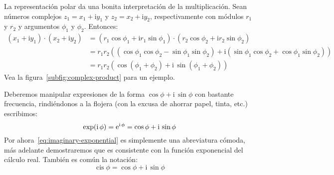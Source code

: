  La representación polar
  da una bonita interpretación de la multiplicación.
  Sean números complejos \(z_1 = x_1 + \mathrm{i} y_1\)
  y \(z_2 = x_2 + \mathrm{i} y_2\),
  respectivamente con módulos \(r_1\) y \(r_2\)
  y argumentos \(\phi_1\) y \(\phi_2\).
  Entonces:
  \begin{align*}
    (x_1 + \mathrm{i} y_1) \cdot (x_2 + \mathrm{i} y_2)
      &= (r_1 \cos \phi_1 + \mathrm{i} r_1 \sin \phi_1)
	   \cdot (r_2 \cos \phi_2 + \mathrm{i} r_2 \sin \phi_2) \\
      &= r_1 r_2
	   \left(
	     (\cos \phi_1 \cos \phi_2 - \sin \phi_1 \sin \phi_2)
	       + \mathrm{i}
		   (\sin \phi_1 \cos \phi_2 + \cos \phi_1 \sin \phi_2)
	   \right) \\
      &= r_1 r_2 (\cos (\phi_1 + \phi_2)
		    + \mathrm{i} \, \sin(\phi_1 + \phi_2))
  \end{align*}
  Vea la figura~\ref{subfig:complex-product} para un ejemplo.

  Deberemos manipular expresiones de la forma
    \(\cos \phi + \mathrm{i} \, \sin \phi\)
  con bastante frecuencia,
  rindiéndonos a la flojera
  (con la excusa de ahorrar papel,
   tinta,
   etc.)
  escribimos:
  \begin{equation}
    \index{C (numeros complejos)@\(\mathbb{C}\) (números complejos)!exponencial}
    \label{eq:imaginary-exponential}
    \exp(\mathrm{i} \, \phi)
      = \mathrm{e}^{\mathrm{i} \, \phi}
      = \cos \phi + \mathrm{i} \, \sin \phi
  \end{equation}
  Por ahora~\eqref{eq:imaginary-exponential}
  es simplemente una abreviatura cómoda,
  más adelante demostraremos que es consistente
  con la función exponencial
  del cálculo real.
  También es común la notación:
  \begin{equation*}
    \operatorname{cis} \phi
      = \cos \phi + \mathrm{i} \, \sin \phi
  \end{equation*}


